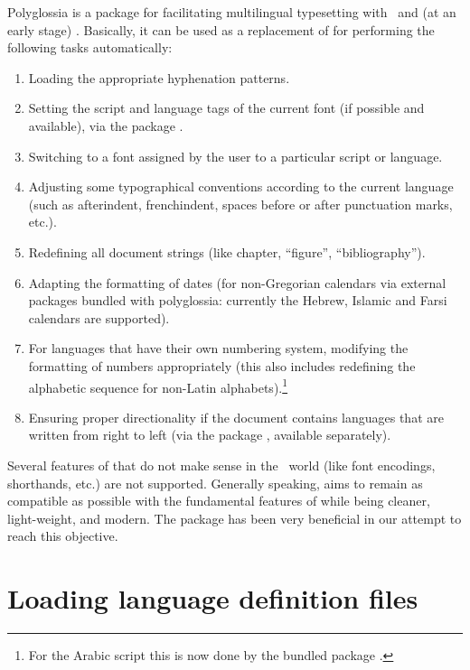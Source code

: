  Polyglossia is a package for facilitating multilingual typesetting with
 \XeLaTeX\ and (at an early stage) \LuaLaTeX.  Basically, it
 can be used as a replacement of  for performing the following
 tasks automatically:
 
 \begin{enumerate}
 \item Loading the appropriate hyphenation patterns.
 \item Setting the script and language tags of the current font (if possible and
       available), via the package .
 \item Switching to a font assigned by the user to a particular script or language.
 \item Adjusting some typographical conventions according to the current language
       (such as afterindent, frenchindent, spaces before or after punctuation marks,
       etc.).
 \item Redefining all document strings (like chapter, “figure”, “bibliography”).
 \item Adapting the formatting of dates (for non-Gregorian calendars via external
       packages bundled with polyglossia: currently the Hebrew, Islamic and Farsi
       calendars are supported).
 \item For languages that have their own numbering system, modifying the formatting
       of numbers appropriately (this also includes redefining the alphabetic sequence
       for non-Latin alphabets).\footnote{ %
         For the Arabic script this is now done by the bundled package .}
 \item Ensuring proper directionality if the document contains languages
       that are written from right to left (via the package ,
       available separately).
 \end{enumerate}
 
 Several features of  that do not make sense in the \XeTeX\ world (like font
 encodings, shorthands, etc.) are not supported.
 Generally speaking,  aims to remain as compatible as possible
 with the fundamental features of  while being cleaner, light-weight,
 and modern. The package  has been very beneficial in our attempt to
 reach this objective.


\section{Loading language definition files}


